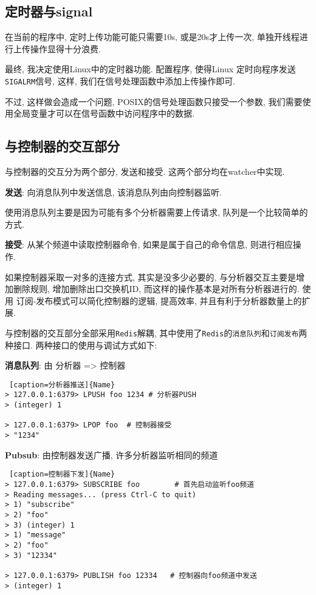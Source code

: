 \subsection{定时器与signal}

在当前的程序中, 定时上传功能可能只需要10s, 或是20s才上传一次,
单独开线程进行上传操作显得十分浪费.

最终, 我决定使用Linux中的定时器功能. 配置程序, 使得Linux
定时向程序发送\texttt{SIGALRM}信号,
这样, 我们在信号处理函数中添加上传操作即可.

不过, 这样做会造成一个问题, POSIX的信号处理函数只接受一个参数,
我们需要使用全局变量才可以在信号函数中访问程序中的数据.

\subsection{与控制器的交互部分}

与控制器的交互分为两个部分, 发送和接受. 这两个部分均在watcher中实现.

\textbf{发送}: 向消息队列中发送信息, 该消息队列由向控制器监听.

使用消息队列主要是因为可能有多个分析器需要上传请求, 队列是一个比较简单的方式.

\textbf{接受}: 从某个频道中读取控制器命令, 如果是属于自己的命令信息, 则进行相应操作.

如果控制器采取一对多的连接方式, 其实是没多少必要的, 与分析器交互主要是增加删除规则,
增加删除出口交换机ID, 而这样的操作基本是对所有分析器进行的. 使用
订阅-发布模式可以简化控制器的逻辑, 提高效率, 并且有利于分析器数量上的扩展.

与控制器的交互部分全部采用\texttt{Redis}解耦,
其中使用了\texttt{Redis}的\texttt{消息队列}和\texttt{订阅发布}两种接口.
两种接口的使用与调试方式如下:

\textbf{消息队列}: 由 分析器 =\textgreater{} 控制器

\begin{lstlisting} [caption=分析器推送]{Name}
> 127.0.0.1:6379> LPUSH foo 1234 # 分析器PUSH
> (integer) 1

> 127.0.0.1:6379> LPOP foo  # 控制器接受
> "1234"
\end{lstlisting}


\textbf{Pubsub}: 由控制器发送广播, 许多分析器监听相同的频道


\begin{lstlisting} [caption=控制器下发]{Name}
> 127.0.0.1:6379> SUBSCRIBE foo        # 首先启动监听foo频道 
> Reading messages... (press Ctrl-C to quit)
> 1) "subscribe"
> 2) "foo"
> 3) (integer) 1
> 1) "message"
> 2) "foo"
> 3) "12334"

> 127.0.0.1:6379> PUBLISH foo 12334   # 控制器向foo频道中发送
> (integer) 1
\end{lstlisting}



